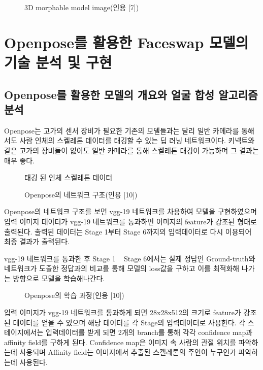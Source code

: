 \begin{figure}[h!]
\centering
\caption{ 3D morphable model image(인용 [7])}
\end{figure}



\chapter{Openpose를 활용한 Faceswap 모델의 기술 분석 및 구현}

\section{Openpose를 활용한 모델의 개요와 얼굴 합성 알고리즘 분석}

Openpose는 고가의 센서 장비가 필요한 기존의 모델들과는 달리 일반 카메라를 통해서도 사람 인체의 스켈레톤 데이터를 태깅할 수 있는 딥 러닝 네트워크이다. 키넥트와 같은 고가의 장비들이 없이도 일반 카메라를 통해 스켈레톤 태깅이 가능하며 그 결과는 매우 좋다.

\begin{figure}[h!]
\centering
\caption{태깅 된 인체 스켈레톤 데이터}
\end{figure}

\begin{figure}[h!]
\centering
\caption{Openpose의 네트워크 구조(인용 [10])}
\end{figure}


Openpose의 네트워크 구조를 보면 vgg-19 네트워크를 차용하여 모델을 구현하였으며 입력 이미지 데이터가 vgg-19 네트워크를 통과하면 이미지의 feature가 강조된 형태로 출력된다. 출력된 데이터는 Stage 1부터 Stage 6까지의 입력데이터로 다시 이용되어 최종 결과가 출력된다.

vgg-19 네트워크를 통과한 후 Stage 1 ~ Stage 6에서는 실제 정답인 Ground-truth와 네트워크가 도출한 정답과의 비교를 통해 모델의 loss값을 구하고 이를 최적화해 나가는 방향으로 모델을 학습해나간다.

\begin{figure}[h!]
\centering
\caption{Openpose의 학습 과정(인용 [10])}
\end{figure}


입력 이미지가 vgg-19 네트워크를 통과하게 되면 28x28x512의 크기로 feature가 강조된 데이터를 얻을 수 있으며 해당 데이터를 각 Stage의 입력데이터로 사용한다. 각 스테이지에서는 입력데이터를 받게 되면 2개의 branch를 통해 각각 confidence map과 affinity field를 구하게 된다. Confidence map은 이미지 속 사람의 관절 위치를 파악하는데 사용되며 Affinity field는 이미지에서 추출된 스켈레톤의 주인이 누구인가 파악하는데 사용된다.

